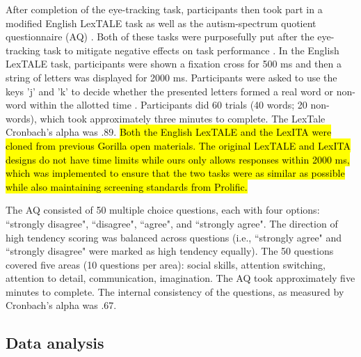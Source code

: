 After completion of the eye-tracking task, participants then took part in a modified English LexTALE \citep{lemhofer2012introducing} task as well as the autism-spectrum quotient questionnaire (AQ) \citep{Baron-Cohen2001}. Both of these tasks were purposefully put after the eye-tracking task to mitigate negative effects on task performance \citep{Chang_2024}. In the English LexTALE task, participants were shown a fixation cross for 500 ms and then a string of letters was displayed for 2000 ms. Participants were asked to use the keys 'j' and 'k' to decide whether the presented letters formed a real word or non-word within the allotted time \cite{lemhofer2012introducing}. Participants did 60 trials (40 words; 20 non-words), which took approximately three minutes to complete. The LexTale Cronbach’s alpha was .89. \hl{Both the English LexTALE and the LexITA were cloned from previous Gorilla open materials. The original LexTALE and LexITA designs do not have time limits while ours only allows responses within 2000 ms, which was implemented to ensure that the two tasks were as similar as possible while also maintaining screening standards from Prolific. }

The AQ \citep{Baron-Cohen2001} consisted of 50 multiple choice questions, each with four options: ``strongly disagree", ``disagree", ``agree", and ``strongly agree". The direction of high tendency scoring was balanced across questions (i.e., ``strongly agree" and ``strongly disagree" were marked as high tendency equally). The 50 questions covered five areas (10 questions per area): social skills, attention switching, attention to detail, communication, imagination. The AQ took approximately five minutes to complete. The internal consistency of the questions, as measured by Cronbach’s alpha was .67.


\subsection{Data analysis}

